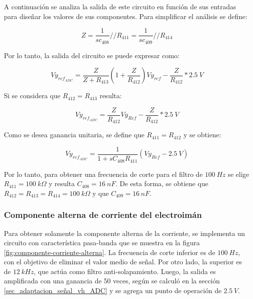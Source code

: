 A continuación se analiza la salida de este circuito en función de sus entradas para diseñar los valores de sus componentes. Para simplificar el análisis se define:

\begin{equation*} 
	Z=\frac{1}{sc_{408}}//R_{411}=\frac{1}{sc_{409}}//R_{414}
\end{equation*}

Por lo tanto, la salida del circuito se puede expresar como:

\begin{equation*} 
	Vy_{ref_{ADC}}=\frac{Z}{Z+R_{413}}(1+\frac{Z}{R_{412}})Vy_{ref}-\frac{Z}{R_{412}}*2.5\:V
\end{equation*}

Si se considera que $R_{412}=R_{413}$ resulta:

\begin{equation*} 
	Vy_{ref_{ADC}}=\frac{Z}{R_{412}}Vy_{Ref}-\frac{Z}{R_{412}}*2.5\:V
\end{equation*}


Como se desea ganancia unitaria, se define que $R_{411}=R_{412}$ y se obtiene:

\begin{equation*} 
	Vy_{ref_{ADC}}=\frac{1}{1+sC_{408}R_{411}}(Vy_{Ref}-2.5\:V)
\end{equation*}


Por lo tanto, para obtener una frecuencia de corte para el filtro de $100\:Hz$ se elige $R_{411}=100\:k\Omega$ y resulta $C_{408}=16\:nF$. De esta forma, se obtiene que $R_{412}=R_{413}=R_{414}=100\:k\Omega$ y que $C_{409}=16\:nF$.


\subsubsection{Componente  alterna de corriente del electroimán}

 Para obtener solamente la componente alterna de la corriente, se implementa un circuito con característica pasa-banda que se muestra en la figura \ref{fig:componente-corriente-alterna}. La frecuencia de corte inferior  es de $100\:Hz$, con el objetivo de eliminar el valor medio de señal. Por otro lado, la superior es de $12\:kHz$, que actúa como filtro anti-solapamiento. Luego, la salida es amplificada con una ganancia de 50 veces, según se calculó en la sección \ref{sec_adaptacion_señal_vh_ADC} y se agrega un punto de operación de $2.5\:V$.


